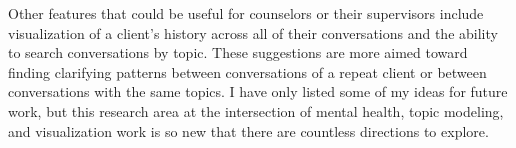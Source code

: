 Other features that could be useful for counselors or their supervisors include visualization of a client's history across all of their conversations and the ability to search conversations by topic. These suggestions are more aimed toward finding clarifying patterns between conversations of a repeat client or between conversations with the same topics. I have only listed some of my ideas for future work, but this research area at the intersection of mental health, topic modeling, and visualization work is so new that there are countless directions to explore.
